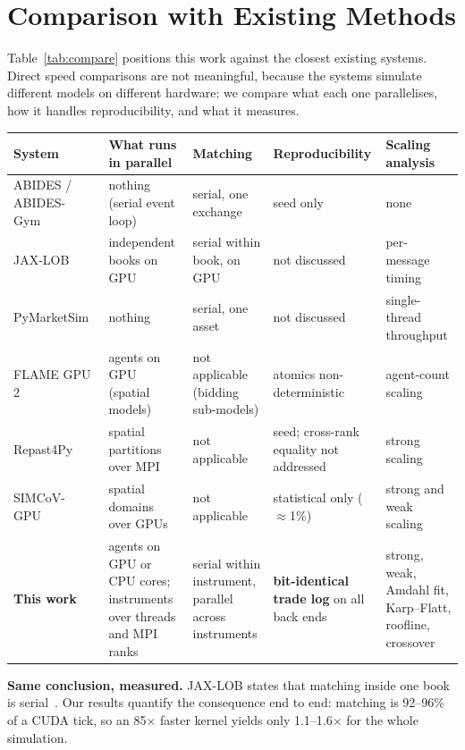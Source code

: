 
\section{Comparison with Existing Methods}\label{sec:compare}
Table~\ref{tab:compare} positions this work against the closest existing systems. Direct speed
comparisons are not meaningful, because the systems simulate different models on different
hardware; we compare what each one parallelises, how it handles reproducibility, and what it
measures.

\begin{widetable}
\centering
\caption{This work compared with existing methods.}
\label{tab:compare}
\footnotesize
\begin{tabularx}{\textwidth}{@{}p{2.4cm} X X X X@{}}
\toprule
System & What runs in parallel & Matching & Reproducibility & Scaling analysis\\
\midrule
ABIDES / ABIDES-Gym~\cite{byrd2020abides,amrouni2021} & nothing (serial event loop) & serial, one exchange & seed only & none\\
JAX-LOB~\cite{frey2023} & independent books on GPU & serial within book, on GPU & not discussed & per-message timing\\
PyMarketSim~\cite{mascioli2024} & nothing & serial, one asset & not discussed & single-thread throughput\\
FLAME GPU 2~\cite{richmond2023} & agents on GPU (spatial models) & not applicable (bidding sub-models) & atomics non-deterministic & agent-count scaling\\
Repast4Py~\cite{collier2022} & spatial partitions over MPI & not applicable & seed; cross-rank equality not addressed & strong scaling\\
SIMCoV-GPU~\cite{leyba2024} & spatial domains over GPUs & not applicable & statistical only ($\approx$1\%) & strong and weak scaling\\
\midrule
\textbf{This work} & agents on GPU or CPU cores; instruments over threads and MPI ranks & serial within instrument, parallel across instruments & \textbf{bit-identical trade log} on all back ends & strong, weak, Amdahl fit, Karp--Flatt, roofline, crossover\\
\bottomrule
\end{tabularx}
\end{widetable}

\textbf{Same conclusion, measured.} JAX-LOB states that matching inside one book is
serial~\cite{frey2023}. Our results quantify the consequence end to end: matching is 92--96\% of a
CUDA tick, so an 85$\times$ faster kernel yields only 1.1--1.6$\times$ for the whole simulation.

